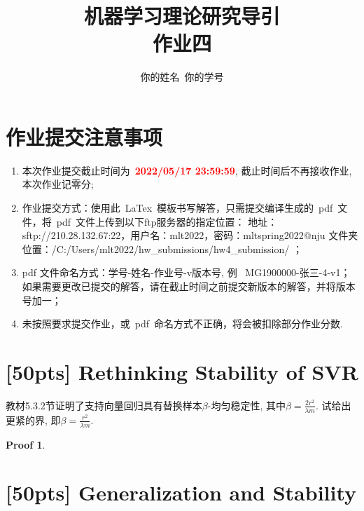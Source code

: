 \documentclass[a4paper,UTF8]{article}
\numberwithin{equation}{section}
\newtheorem*{myProof}{Proof}
\begin{document}
\title{机器学习理论研究导引\\
作业四}
\author{你的姓名\, 你的学号} 
\maketitle

\section*{作业提交注意事项}

\begin{tcolorbox}
    \begin{enumerate}
        \item[(1)] 本次作业提交截止时间为~\textcolor{red}{\textbf{2022/05/17  23:59:59}}, 截止时间后不再接收作业, 本次作业记零分; 
        \item[(2)] 作业提交方式：使用此~LaTex~模板书写解答，只需提交编译生成的~pdf~文件，将~pdf~文件上传到以下ftp服务器的指定位置：
        \newline 地址：sftp://210.28.132.67:22，用户名：mlt2022，密码：mltspring2022@nju
        \newline 文件夹位置：/C:/Users/mlt2022/hw\_submissions/hw4\_submission/  ；
        \item[(3)] pdf 文件命名方式：学号-姓名-作业号-v版本号, 例~ MG1900000-张三-4-v1；如果需要更改已提交的解答，请在截止时间之前提交新版本的解答，并将版本号加一；
        \item[(4)] 未按照要求提交作业，或~pdf~命名方式不正确，将会被扣除部分作业分数. 
    \end{enumerate}
\end{tcolorbox}

\newpage

\section{[50pts] Rethinking Stability of SVR} 
教材5.3.2节证明了支持向量回归具有替换样本$\beta$-均匀稳定性, 其中$\beta=\frac{2r^2}{\lambda m}$. 试给出更紧的界, 即$\beta=\frac{r^2}{\lambda m}$.

\begin{myProof}~\\ 

\end{myProof}

\newpage

\section{[50pts] Generalization and Stability} 
\end{document}
